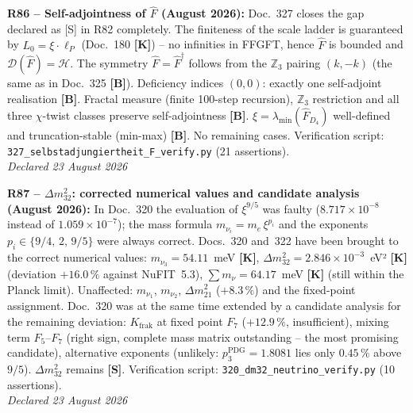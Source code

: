 \textbf{R86 -- Self-adjointness of $\hat{F}$ (August 2026):}
Doc.~327 closes the gap declared as [S] in R82 completely.
The finiteness of the scale ladder is guaranteed by $L_0 = \xi\cdot\ell_P$
(Doc.~180 \textbf{[K]}) -- no infinities in FFGFT,
hence $\hat{F}$ is bounded and $\mathcal{D}(\hat{F}) = \mathcal{H}$.
The symmetry $\hat{F} = \hat{F}^\dagger$ follows from the $\mathbb{Z}_3$ pairing
$(k,-k)$ (the same as in Doc.~325 \textbf{[B]}).
Deficiency indices $(0,0)$: exactly one self-adjoint realisation \textbf{[B]}.
Fractal measure (finite 100-step recursion), $\mathbb{Z}_3$ restriction
and all three $\chi$-twist classes preserve self-adjointness \textbf{[B]}.
$\xi = \lambda_{\min}(\hat{F}_{D_4})$ well-defined and truncation-stable
(min-max) \textbf{[B]}.
No remaining cases.
Verification script: \texttt{327\_selbstadjungiertheit\_F\_verify.py} (21 assertions).\\
\emph{Declared 23 August 2026}

\medskip

\textbf{R87 -- $\Delta m_{32}^2$: corrected numerical values and candidate analysis (August 2026):}
In Doc.~320 the evaluation of $\xi^{9/5}$ was faulty ($8.717\times10^{-8}$ instead of
$1.059\times10^{-7}$); the mass formula $m_{\nu_i} = m_e\,\xi^{p_i}$ and the exponents
$p_i \in \{9/4,\,2,\,9/5\}$ were always correct. Docs.~320 and~322 have been brought to
the correct numerical values: $m_{\nu_3} = 54.11$~meV \textbf{[K]},
$\Delta m_{32}^2 = 2.846\times10^{-3}$~eV² \textbf{[K]} (deviation $+16.0\,\%$ against
NuFIT~5.3), $\sum m_\nu = 64.17$~meV \textbf{[K]} (still within the Planck limit).
Unaffected: $m_{\nu_1}$, $m_{\nu_2}$, $\Delta m_{21}^2$ ($+8.3\,\%$) and the fixed-point
assignment. Doc.~320 was at the same time extended by a candidate analysis for the
remaining deviation: $K_{\mathrm{frak}}$ at fixed point $F_7$ ($+12.9\,\%$,
insufficient), mixing term $F_5$--$F_7$ (right sign, complete mass matrix outstanding --
the most promising candidate), alternative exponents (unlikely:
$p_3^{\mathrm{PDG}} = 1.8081$ lies only $0.45\,\%$ above $9/5$).
$\Delta m_{32}^2$ remains \textbf{[S]}.
Verification script: \texttt{320\_dm32\_neutrino\_verify.py} (10 assertions).\\
\emph{Declared 23 August 2026}

\medskip


